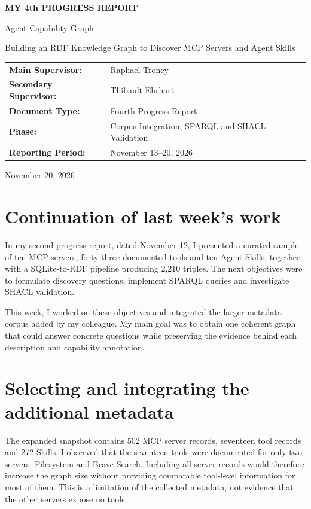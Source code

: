 \documentclass[11pt,a4paper]{article}
\begin{document}
\hypersetup{pageanchor=false}
\begin{titlepage}
\centering
\vspace*{1.5cm}
{\LARGE\bfseries MY 4th PROGRESS REPORT\par}
\vspace{1.5cm}
{\Huge Agent Capability Graph\par}
\vspace{0.4cm}
{\Large Building an RDF Knowledge Graph to Discover MCP Servers and Agent Skills\par}
\vspace{1.5cm}
\begin{tabular}{ll}
\textbf{Main Supervisor:} & Raphael Troncy \\
\textbf{Secondary Supervisor:} & Thibault Ehrhart \\
\textbf{Document Type:} & Fourth Progress Report \\
\textbf{Phase:} & Corpus Integration, SPARQL and SHACL Validation \\
\textbf{Reporting Period:} & November 13--20, 2026
\end{tabular}
\vfill
{\large November 20, 2026\par}
\end{titlepage}
\hypersetup{pageanchor=true}

\section{Continuation of last week's work}

In my second progress report, dated November 12, I presented a curated sample of ten MCP servers, forty-three documented tools and ten Agent Skills, together with a SQLite-to-RDF pipeline producing 2,210 triples. The next objectives were to formulate discovery questions, implement SPARQL queries and investigate SHACL validation.

This week, I worked on these objectives and integrated the larger metadata corpus added by my colleague. My main goal was to obtain one coherent graph that could answer concrete questions while preserving the evidence behind each description and capability annotation.

\section{Selecting and integrating the additional metadata}

The expanded snapshot contains 502 MCP server records, seventeen tool records and 272 Skills. I observed that the seventeen tools were documented for only two servers: Filesystem and Brave Search. Including all server records would therefore increase the graph size without providing comparable tool-level information for most of them. This is a limitation of the collected metadata, not evidence that the other servers expose no tools.
\end{document}
